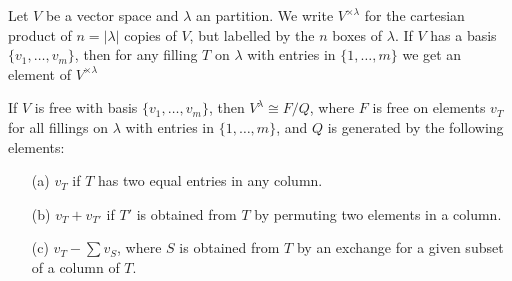 Let $V$ be a vector space and $\lambda$ an partition. We write $V^{\times\lambda}$ for the cartesian product of $n=|\lambda|$ copies of $V$, but labelled by the $n$ boxes of $\lambda$. If $V$ has a basis $\{v_1,\dots,v_m\}$, then for any filling $T$ on $\lambda$ with entries in $\{1,\dots,m\}$ we get an element of $V^{\times\lambda}$
\begin{lemma}\label{Weyl module char by conditions}
If $V$ is free with basis $\{v_1,\dots,v_m\}$, then $V^\lambda\cong F/Q$, where $F$ is free on elements $v_T$ for all fillings on $\lambda$ with entries in $\{1,\dots,m\}$, and $Q$ is generated by the following elements:
\begin{itemize}
\item[(a)] $v_T$ if $T$ has two equal entries in any column.
\item[(b)] $v_T+v_{T'}$ if $T'$ is obtained from $T$ by permuting two elements in a column.
\item[(c)] $v_T-\sum v_S$, where $S$ is obtained from $T$ by an exchange for a given subset of a column of $T$.
\end{itemize}
\end{lemma}
